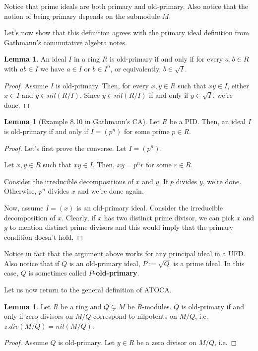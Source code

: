 \documentclass{article}
\theoremstyle{definition}
\newtheorem{lemma}[theorem]{Lemma}
\begin{document}
Notice that prime ideals are both primary and old-primary. Also notice that
the notion of being primary depends on the submodule $ M $.

Let's now show that this definition agrees with the primary ideal definition from Gathmann's
commutative algebra notes.

\begin{lemma}
    An ideal $ I $ in a ring $ R $ is old-primary if and only if for every $ a,b \in R $
    with $ ab \in I $ we have $ a \in I $ or $ b \in I^{n} $, or equivalently, $ b \in \sqrt{I} $.
\end{lemma}
\begin{proof}
    Assume $ I $ is old-primary. Then, for every $ x, y \in R $ such that $ xy \in I $,
    either $ x \in I $ and $ y \in nil(R/I) $. Since $ y \in nil(R/I) $ if and only if
    $ y \in \sqrt{I} $, we're done.
\end{proof}

\begin{lemma}[Example 8.10 in Gathmann's CA]
    Let $ R $ be a PID. Then, an ideal $ I $ is old-primary if and only if
    $ I = (p^{n}) $ for some prime $ p \in R $.
\end{lemma}
\begin{proof}
    Let's first prove the converse. Let $ I = (p^{n}) $.

    Let $ x,y \in R $ such that $ xy \in I $. 
    Then, $ xy = p^{n} r $ for some $ r \in R $. 

    Consider the irreducible decompositions of $ x $ and $ y $. If $ p $ divides $ y $, we're done.
    Otherwise, $ p^{n} $ divides $ x $ and we're done again.

    Now, assume $ I = (x) $ is an old-primary ideal. Consider the irreducible decomposition of $ x $.
    Clearly, if $ x $ has two distinct prime divisor, we can pick $ x $ and $ y $ to mention
    distinct prime divisors and this would imply that the primary condition doesn't hold.
\end{proof}

Notice in fact that the argument above works for any principal ideal in a UFD. Also notice
that if $ Q $ is an old-primary ideal, $ P := \sqrt{Q} $ is a prime ideal. In this case, $ Q $
is sometimes called \textbf{$ P $-old-primary}.

Let us now return to the general definition of ATOCA.

\begin{lemma}
    Let $ R $ be a ring and $ Q \subsetneq M $ be $ R $-modules.
    $ Q $ is old-primary if and only if zero divisors on $ M/Q $
    correspond to nilpotents on $ M/Q $, i.e. $ z.div(M/Q) = nil(M/Q) $.
\end{lemma}
\begin{proof}
    Assume $ Q $ is old-primary.
    Let $ y \in R $ be a zero divisor on $ M/Q $, i.e. 
\end{proof}
\end{document}
